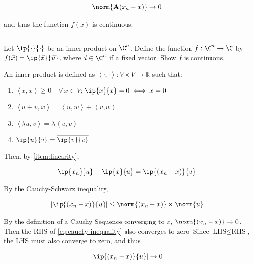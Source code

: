 \documentclass{template}
\begin{document}
\begin{equation}
    \norm{\mathbf{A}(x_n - x)} \rightarrow 0
\end{equation}

and thus the function $f(x)$ is continuous.

\subsection{}

Let $\ip{\cdot}{\cdot}$ be an inner product on $\C^n$. Define the function $f:\C^n \to \C$ by $f(\vec{x}) = \ip{\vec{x}}{\vec{u}}$, where  $\vec{u} \in \C^n$ if a fixed vector. Show $f$ is continuous.

An inner product is defined as $\left<\cdot,\cdot\right> : V\times V \rightarrow \mathbb{K}$ such that:

\begin{enumerate}[label=(\roman*)]
    \item\label{item:positive-definite} $\left<x,x\right> \geq 0 \quad \forall \: x \in V$; \qquad $\ip{x}{x} = 0 \iff x=0$
    \item\label{item:linearity} $\left<u+v, w\right> = \left<u, w\right> + \left<v, w\right>$
    \item\label{item:scalability} $\left<\lambda u, v\right> = \lambda\left<u, v \right>$
    \item\label{item:conjugate-symm} $\ip{u}{v} = \overline{\ip{v}{u}}$
\end{enumerate}

Then, by \autoref{item:linearity}, 

\begin{equation}
    \ip{x_n}{u} - \ip{x}{u} = \ip{(x_n - x)}{u}
\end{equation}

By the Cauchy-Schwarz inequality, 

\begin{equation}\label{eq:cauchy-inequality}
      |{\ip{(x_n - x)}{u}}| \leq \norm{(x_n - x)}\times\norm{u}
\end{equation}

By the definition of a Cauchy Sequence converging to $x$, $\norm{(x_n - x)}\rightarrow 0$. Then the RHS of \autoref{eq:cauchy-inequality} also converges to zero. Since $\text{LHS}\leq\text{RHS}$, the LHS must also converge to zero, and thus

\begin{equation}
      |{\ip{(x_n - x)}{u}}| \rightarrow 0
\end{equation}
\end{document}
